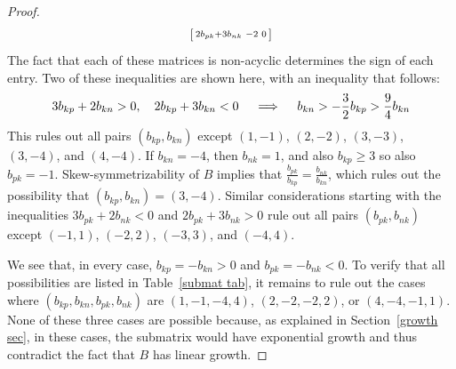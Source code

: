 \documentclass[10pt]{article}
\theoremstyle{definition}
\theoremstyle{remark}
\numberwithin{equation}{section}
\newcommand{\0}{{\mathbf{0}}}
\begin{document}
\begin{proof}
\begin{multline*}
\begin{bsmallmatrix*}
	2b_{pk}+3b_{nk} & -2 & 0
\end{bsmallmatrix*}
\end{multline*}
The fact that each of these matrices is non-acyclic determines the sign of each entry.
Two of these inequalities are shown here, with an inequality that follows:
\[
3b_{kp}+2b_{kn}>0,\quad 2b_{kp}+3b_{kn}<0\quad \implies\quad b_{kn}>-\frac32b_{kp}>\frac94b_{kn}\\
\]
This rules out all pairs $(b_{kp},b_{kn})$ except $(1,-1)$, $(2,-2)$, $(3,-3)$, $(3,-4)$, and $(4,-4)$.
If $b_{kn}=-4$, then $b_{nk}=1$, and also $b_{kp}\ge3$ so also $b_{pk}=-1$.
Skew-symmetrizability of $B$ implies that $\frac{b_{pk}}{b_{kp}}=\frac{b_{nk}}{b_{kn}}$, which rules out the possibility that $(b_{kp},b_{kn})=(3,-4)$.
Similar considerations starting with the inequalities $3b_{pk}+2b_{nk}<0$ and $2b_{pk}+3b_{nk}>0$ rule out all pairs $(b_{pk},b_{nk})$ except $(-1,1)$, $(-2,2)$, $(-3,3)$, and $(-4,4)$.

We see that, in every case, $b_{kp}=-b_{kn}>0$ and $b_{pk}=-b_{nk}<0$.
To verify that all possibilities are listed in Table~\ref{submat tab}, it remains to rule out the cases where $(b_{kp},b_{kn},b_{pk},b_{nk})$ are $(1,-1,-4,4)$, $(2,-2,-2,2)$, or $(4,-4,-1,1)$.
None of these three cases are possible because, as explained in Section~\ref{growth sec}, in these cases, the submatrix would  have exponential growth and thus contradict the fact that $B$ has linear growth.


\end{proof}
\end{document}
